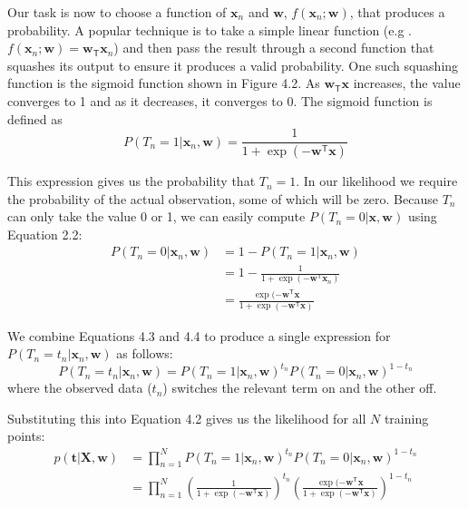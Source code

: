 Our task is now to choose a function of $\mathbf{x}_n$ and $\mathbf{w}$,
$f(\mathbf{x}_n; \mathbf{w})$, that produces a
probability. A popular technique is to take a simple linear function
(e.g . $f(\mathbf{x}_n; \mathbf{w}) = \mathbf{w}_{\mathsf{T}} \mathbf{x}_n$)
and then pass the result through a second function that squashes its output
to ensure it produces a valid probability. One such squashing function is the sigmoid
function shown in Figure 4.2. As $\mathbf{w}_{\mathsf{T}} \mathbf{x}$
increases, the value converges to 1 and as it
decreases, it converges to 0. The sigmoid function is defined as
\begin{equation}
P(T_{n} = 1 | \mathbf{x}_n, \mathbf{w}) =
\frac{1}{1 + \exp( -\mathbf{w}^{\mathsf{T}} \mathbf{x} )}
\label{eq:sigmoidfunc}
\end{equation}


This expression gives us the probability that $T_{n} = 1$.
In our likelihood we require
the probability of the actual observation, some of which will be zero.
Because $T_n$ can
only take the value 0 or 1, we can easily compute
$P(T_{n} = 0 | \mathbf{x},\mathbf{w})$ using Equation 2.2:
\begin{align}
P(T_{n}=0 | \mathbf{x}_{n}, \mathbf{w}) & = 1 - P(T_{n}=1 | \mathbf{x}_{n}, \mathbf{w}) \nonumber \\
& = 1 - \frac{1}{1 + \exp( -\mathbf{w}^{\mathsf{T}} \mathbf{x}_n )} \nonumber \\
& = \frac{\exp( -\mathbf{w}^{\mathsf{T}} \mathbf{x}}{1 + \exp( -\mathbf{w}^{\mathsf{T}} \mathbf{x} )}
\end{align}

We combine Equations 4.3 and 4.4 to produce a single expression for
$P(T_n = t_n| \mathbf{x}_n, \mathbf{w})$ as follows:
\begin{equation*}
P(T_n = t_n| \mathbf{x}_n, \mathbf{w}) = 
P(T_n = 1| \mathbf{x}_n, \mathbf{w})^{t_n}
P(T_n = 0| \mathbf{x}_n, \mathbf{w})^{1 - t_n}
\end{equation*}
where the observed data ($t_n$) switches the relevant term on and the other off.

Substituting this into Equation 4.2 gives us the likelihood for all $N$ training
points:
\begin{align}
p(\mathbf{t}|\mathbf{X},\mathbf{w}) & = \prod_{n=1}^{N}
P(T_n = 1| \mathbf{x}_n, \mathbf{w})^{t_n}
P(T_n = 0| \mathbf{x}_n, \mathbf{w})^{1 - t_n} \nonumber \\
& = \prod_{n=1}^{N}
\left(
\frac{1}{1 + \exp( -\mathbf{w}^{\mathsf{T}} \mathbf{x} )}
\right)^{t_n}
\left(
\frac{\exp( -\mathbf{w}^{\mathsf{T}} \mathbf{x}}{1 + \exp( -\mathbf{w}^{\mathsf{T}} \mathbf{x} )}
\right)^{1 - t_n}
\end{align}


